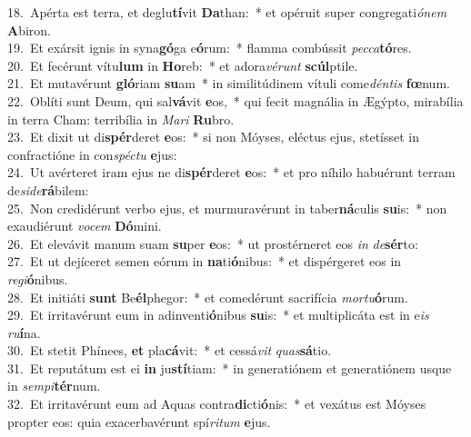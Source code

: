 {18.~}Apérta est terra, et deglu\textbf{tí}vit \textbf{Da}than:~* et opéruit super congregati\textit{ó}\textit{nem} \textbf{A}biron.\\
{19.~}Et exársit ignis in syna\textbf{gó}ga e\textbf{ó}rum:~* flamma combússit \textit{pec}\textit{ca}\textbf{tó}res.\\
{20.~}Et fecérunt vítu\textbf{lum} in \textbf{Ho}reb:~* et adora\textit{vé}\textit{runt} \textbf{scúl}ptile.\\
{21.~}Et mutavérunt \textbf{gló}riam \textbf{su}am~* in similitúdinem vítuli come\textit{dén}\textit{tis} \textbf{fœ}num.\\
{22.~}Oblíti sunt Deum, qui sal\textbf{vá}vit \textbf{e}os,~* qui fecit magnália in Ægýpto, mirabília in terra Cham: terribília in \textit{Ma}\textit{ri} \textbf{Ru}bro.\\
{23.~}Et dixit ut di\textbf{spér}deret \textbf{e}os:~* si non Móyses, eléctus ejus, stetísset in confractióne in con\textit{spé}\textit{ctu} \textbf{e}jus:\\
{24.~}Ut avérteret iram ejus ne di\textbf{spér}deret \textbf{e}os:~* et pro níhilo habuérunt terram de\textit{si}\textit{de}\textbf{rá}bilem:\\
{25.~}Non credidérunt verbo ejus, et murmuravérunt in taber\textbf{ná}culis \textbf{su}is:~* non exaudiérunt \textit{vo}\textit{cem} \textbf{Dó}mini.\\
{26.~}Et elevávit manum suam \textbf{su}per \textbf{e}os:~* ut prostérneret eos \textit{in} \textit{de}\textbf{sér}to:\\
{27.~}Et ut dejíceret semen eórum in \textbf{na}ti\textbf{ó}nibus:~* et dispérgeret eos in \textit{re}\textit{gi}\textbf{ó}nibus.\\
{28.~}Et initiáti \textbf{sunt} Be\textbf{él}phegor:~* et comedérunt sacrifícia \textit{mor}\textit{tu}\textbf{ó}rum.\\
{29.~}Et irritavérunt eum in adinventi\textbf{ó}nibus \textbf{su}is:~* et multiplicáta est in e\textit{is} \textit{ru}\textbf{í}na.\\
{30.~}Et stetit Phínees, \textbf{et} pla\textbf{cá}vit:~* et cessá\textit{vit} \textit{quas}\textbf{sá}tio.\\
{31.~}Et reputátum est ei \textbf{in} ju\textbf{stí}tiam:~* in generatiónem et generatiónem usque in \textit{sem}\textit{pi}\textbf{tér}num.\\
{32.~}Et irritavérunt eum ad Aquas contra\textbf{di}cti\textbf{ó}nis:~* et vexátus est Móyses propter eos: quia exacerbavérunt spí\textit{ri}\textit{tum} \textbf{e}jus.\\
